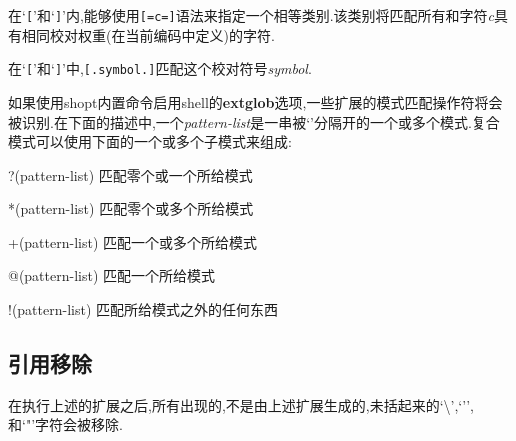 \documentclass[draft,openany]{book}
\begin{document}
\begin{CJK}{UTF8}{gbsn}
\begin{basedescript}{\desclabelstyle{\nextlinelabel}\desclabelwidth{2.5em}}
        在`\verb+[+'和`\verb+]+'内,能够使用\verb+[=c=]+语法来指定一个相等类别.该类别将匹配所有和字符\emph{c}具有相同校对权重(在当前编码中定义)的字符.\par
        在`\verb+[+'和`\verb+]+'中,\verb+[.symbol.]+匹配这个校对符号\emph{symbol}.\par
        如果使用shopt内置命令启用shell的\textbf{extglob}选项,一些扩展的模式匹配操作符将会被识别.在下面的描述中,一个\emph{pattern-list}是一串被`\textbar'分隔开的一个或多个模式.复合模式可以使用下面的一个或多个子模式来组成:
        \begin{basedescript}{\desclabelstyle{\nextlinelabel}\desclabelwidth{2.5em}}
        \item[?(pattern-list)] 匹配零个或一个所给模式
        \item[*(pattern-list)] 匹配零个或多个所给模式
        \item[+(pattern-list)] 匹配一个或多个所给模式
        \item[@(pattern-list)] 匹配一个所给模式
        \item[!(pattern-list)] 匹配所给模式之外的任何东西
        \end{basedescript}
    \end{basedescript}

    \subsection{引用移除}
    在执行上述的扩展之后,所有出现的,不是由上述扩展生成的,未括起来的`\textbackslash',`'',和`"'字符会被移除.


\end{CJK}
\end{document}
